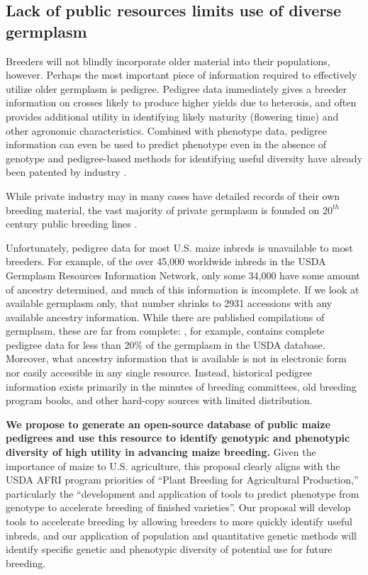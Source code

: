 \documentclass[draft,12pt]{article}
\begin{document}
\subsection*{Lack of public resources limits use of diverse germplasm}

Breeders will not blindly incorporate older material into their populations, however.  
Perhaps the most important piece of information required to effectively utilize older germplasm is pedigree.
Pedigree data immediately gives a breeder information on crosses likely to produce higher yields due to heterosis, and often provides additional utility in identifying likely maturity (flowering time) and other agronomic characteristics. 
Combined with phenotype data, pedigree information can even be used to predict phenotype even in the absence of genotype \citep{piepho2008blup} and pedigree-based methods for identifying useful diversity have already been patented by industry \citep{sebastian1995method}.

While private industry may in many cases have detailed records of their own breeding material, the vast majority of private germplasm is founded on $20^{th}$ century public breeding lines \citep{nelson2008molecular}.

Unfortunately, pedigree data for most U.S. maize inbreds is unavailable to most breeders. 
For example, of the over 45,000 worldwide inbreds in the USDA Germplasm Resources Information Network, only some 34,000 have some amount of ancestry determined, and much of this information is incomplete.
If we look at available germplasm only, that number shrinks to 2931 accessions with any available ancestry information.
While there are published compilations of germplasm, these are far from complete:  \citet{gerdes1993compilation}, for example, contains complete pedigree data for less than 20\% of the germplasm in the USDA database.
Moreover, what ancestry information that is available is not in electronic form nor easily accessible in any single resource.  
Instead, historical pedigree information exists primarily in the minutes of breeding committees, old breeding program books, and other hard-copy sources with limited distribution.  

\textbf{We propose to generate an open-source database of public maize pedigrees and use this resource to identify genotypic and phenotypic diversity of high utility in advancing maize breeding.}
Given the importance of maize to U.S. agriculture, this proposal clearly aligns with the USDA AFRI program priorities of ``Plant Breeding for Agricultural Production,'' particularly the ``development and application of tools to predict phenotype from genotype to accelerate breeding of finished varieties''.   
Our proposal will develop tools to accelerate breeding by allowing breeders to more quickly identify useful inbreds, and our application of population and quantitative genetic methods will identify specific genetic and phenotypic diversity of potential use for future breeding.  
\end{document}
